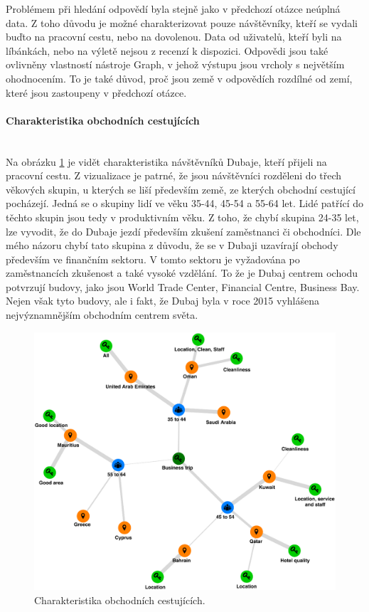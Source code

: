 \documentclass[czech,BP]{thesiskiv}
\begin{document}
Problémem při hledání odpovědí byla stejně jako v předchozí otázce neúplná data. Z toho důvodu je možné charakterizovat pouze návštěvníky, kteří se vydali buďto na pracovní cestu, nebo na dovolenou. Data od uživatelů, kteří byli na líbánkách, nebo na výletě nejsou z recenzí k dispozici. Odpovědi jsou také ovlivněny vlastností nástroje Graph, v jehož výstupu jsou vrcholy s největším ohodnocením. To je také důvod, proč jsou země v odpovědích rozdílné od zemí, které jsou zastoupeny v předchozí otázce.
\paragraph{Charakteristika obchodních cestujících}
\mbox{}\\
Na obrázku \ref{fig:Business} je vidět charakteristika návštěvníků Dubaje, kteří přijeli na pracovní cestu. Z vizualizace je patrné, že jsou návštěvníci rozděleni do třech věkových skupin, u kterých se liší především země, ze kterých obchodní cestující pocházejí. Jedná se o skupiny lidí ve věku 35-44, 45-54 a 55-64 let. Lidé patřící do těchto skupin jsou tedy v produktivním věku. Z toho, že chybí skupina 24-35 let, lze vyvodit, že do Dubaje jezdí především zkušení zaměstnanci či obchodníci. Dle mého názoru chybí tato skupina z důvodu, že se v Dubaji uzavírají obchody především ve finančním sektoru. V tomto sektoru je vyžadována po zaměstnancích zkušenost a také vysoké vzdělání. To že je Dubaj centrem ochodu potvrzují budovy, jako jsou World Trade Center, Financial Centre, Business Bay. Nejen však tyto budovy, ale i fakt, že Dubaj byla v roce 2015 vyhlášena nejvýznamnějším obchodním centrem světa.\cite{BusinessDubai} 

\begin{figure}[htbp]
	\centering
	\includegraphics[width = \textwidth]{img/Business_trip_customers_proportions.eps}
	\caption{Charakteristika obchodních cestujících.}
	\label{fig:Business}	
\end{figure}
\end{document}
